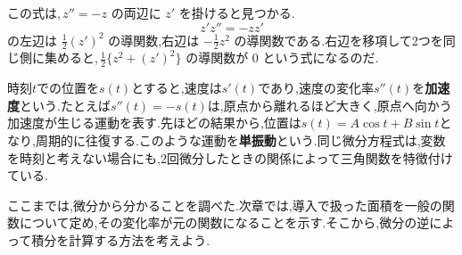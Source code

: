この式は,\,$z''=-z$ の両辺に $z'$ を掛けると見つかる.
\[
 z'z''=-zz'
\]
の左辺は $\frac12(z')^2$ の導関数,右辺は $-\frac12z^2$ の導関数である.右辺を移項して2つを同じ側に集めると,\,$\frac12\{z^2+(z')^2\}$ の導関数が $0$ という式になるのだ.

時刻$t$での位置を$s(t)$とすると,速度は$s'(t)$であり,速度の変化率$s''(t)$を\textbf{加速度}という.たとえば$s''(t)=-s(t)$は,原点から離れるほど大きく,原点へ向かう加速度が生じる運動を表す.先ほどの結果から,位置は$s(t)=A\cos t+B\sin t$となり,周期的に往復する.このような運動を\textbf{単振動}という.同じ微分方程式は,変数を時刻と考えない場合にも,2回微分したときの関係によって三角関数を特徴付けている.

ここまでは,微分から分かることを調べた.次章では,導入で扱った面積を一般の関数について定め,その変化率が元の関数になることを示す.そこから,微分の逆によって積分を計算する方法を考えよう.
